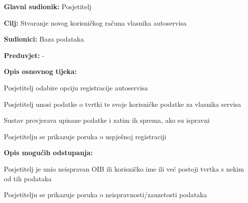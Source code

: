 \noindent {}
\begin{packed_item}
	
	\item \textbf{Glavni sudionik: } Posjetitelj
	\item  \textbf{Cilj:} Stvaranje novog korisničkog računa vlasnika
	autoservisa
	\item  \textbf{Sudionici:} Baza podataka
	\item  \textbf{Preduvjet:} -
	\item  \textbf{Opis osnovnog tijeka:}
	
	\item[] \begin{packed_enum}
		
		\item Posjetitelj odabire opciju registracije autoservisa
		\item Posjetitelj unosi podatke o tvrtki te svoje korisničke podatke za
		vlasnika servisa
		\item Sustav provjerava upisane podatke i zatim ih sprema, ako su ispravni
		\item Posjetitelju se prikazuje poruka o uspješnoj registraciji
	\end{packed_enum}
	
	\item  \textbf{Opis mogućih odstupanja:}
	
	\item[] \begin{packed_item}
		
		\item[3.a] Posjetitelj je unio neispravan OIB ili korisničko ime ili već
		postoji tvrtka s nekim od tih podataka
		\item[] \begin{packed_enum}
			
			\item Posjetitelju se prikazuje poruka o neispravnosti/zauzetosti
			podataka
			
		\end{packed_enum}
		
	\end{packed_item}
\end{packed_item}

